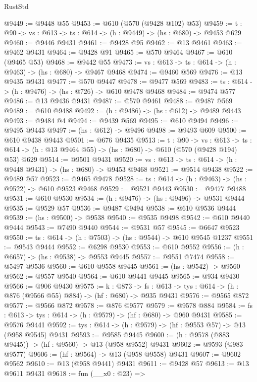 \begin{lexlean}{RustStd}
\begin{coremodule}
@9449 := @9448 @55
@9453 := @610 (@570 (@9428 @102) @53)
@9459 := {t : @90} -> {vs : @613} -> {ts : @614} -> (h : @9449) -> (hs : @680) -> @9453 @629
@9460 := @9446 @9431
@9461 := @9428 @95
@9462 := @13 @9461
@9463 := @9462 @9431
@9464 := @9428 @91
@9465 := @570 @9464
@9467 := @610 (@9465 @53)
@9468 := @9442 @55
@9473 := {vs : @613} -> {ts : @614} -> (h : @9463) -> (hs : @680) -> @9467 @9468
@9474 := @9460 @569
@9476 := @13 @9435 @9431
@9477 := @570 @9447
@9478 := @9477 @569
@9483 := {ts : @614} -> (h : @9476) -> (hs : @726) -> @610 @9478 @9468
@9484 := @9474 @577
@9486 := @13 @9436 @9431
@9487 := @570 @9461
@9488 := @9487 @569
@9489 := @610 @9488
@9492 := (h : @9486) -> (hs : @612) -> @9489 @9443
@9493 := @9484 @4
@9494 := @9439 @569
@9495 := @610 @9494
@9496 := @9495 @9443
@9497 := (hs : @612) -> @9496
@9498 := @9493 @609
@9500 := @610 @9438 @9443
@9501 := @676 @9435
@9513 := {t : @90} ->
  {vs : @613} ->
  {ts : @614} -> (h : @13 @9464 @55) -> (hs : @680) -> @610 (@570 (@9428 @194) @53) @629
@9514 := @9501 @9431
@9520 := {vs : @613} -> {ts : @614} -> (h : @9448 @9431) -> (hs : @680) -> @9453 @9468
@9521 := @9514 @9438
@9522 := @9489 @57
@9523 := @9465 @9478
@9528 := {ts : @614} -> (h : @9463) -> (hs : @9522) -> @610 @9523 @9468
@9529 := @9521 @9443
@9530 := @9477 @9488
@9531 := @610 @9530
@9534 := (h : @9476) -> (hs : @9496) -> @9531 @9444
@9535 := @9529 @57
@9536 := @9487 @9494
@9538 := @610 @9536 @9444
@9539 := (hs : @9500) -> @9538
@9540 := @9535 @9498
@9542 := @610 @9440 @9444
@9543 := @7490 @9440
@9544 := @9531 @57
@9545 := @6647 @9523
@9550 := {ts : @614} -> (h : @7503) -> (hs : @9544) -> @610 @9545 @1237
@9551 := @9543 @9444
@9552 := @6298 @9530
@9553 := @610 @9552
@9556 := (h : @6657) -> (hs : @9538) -> @9553 @9445
@9557 := @9551 @7474
@9558 := @5497 @9536
@9560 := @610 @9558 @9445
@9561 := (hs : @9542) -> @9560
@9562 := @9557 @9540
@9564 := @610 @9441 @9445
@9565 := @934 @9430
@9566 := @906 @9430
@9575 := {k : @873} ->
  {fs : @613} -> {tys : @614} -> (h : @876 (@9566 @55) @884) -> (hf : @680) -> @935 @9431
@9576 := @9565 @872
@9577 := @9566 @872
@9578 := @876 @9577
@9579 := @9578 @884
@9584 := {fs : @613} -> {tys : @614} -> (h : @9579) -> (hf : @680) -> @960 @9431
@9585 := @9576 @9441
@9592 := {tys : @614} -> (h : @9579) -> (hf : @9553 @57) -> @13 (@958 @9545) @9431
@9593 := @9585 @9445
@9600 := (h : @9578 (@883 @9445)) -> (hf : @9560) -> @13 (@958 @9552) @9431
@9602 := @9593 (@983 @9577)
@9606 := (hf : @9564) -> @13 (@958 @9558) @9431
@9607 := @9602 @9562
@9610 := @13 (@958 @9441) @9431
@9611 := @9428 @57
@9613 := @13 @9611 @9431
@9618 := fun (__x0 : @23) =>

\end{coremodule}
\end{lexlean}
